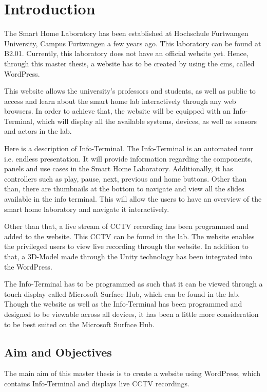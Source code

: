\chapter{Introduction}

The Smart Home Laboratory has been established at Hochschule Furtwangen University, Campus Furtwangen a few years ago. This laboratory can be found at B2.01. Currently, this laboratory does not have an official website yet. Hence, through this master thesis, a website has to be created by using the \ac{cms}, called WordPress.

This website allows the university's professors and students, as well as public to access and learn about the smart home lab interactively through any web browsers. In order to achieve that, the website will be equipped with an Info-Terminal, which will display all the available systems, devices, as well as sensors and actors in the lab.

Here is a description of Info-Terminal. The Info-Terminal is an automated tour i.e. endless presentation. It will provide information regarding the components, panels and use cases in the Smart Home Laboratory. Additionally, it has controllers such as play, pause, next, previous and home buttons. Other than than, there are thumbnails at the bottom to navigate and view all the slides available in the info terminal. This will allow the users to have an overview of the smart home laboratory and navigate it interactively.

Other than that, a live stream of CCTV recording has been programmed and added to the website. This CCTV can be found in the lab. The website enables the privileged users to view live recording through the website. In addition to that, a 3D-Model made through the Unity technology has been integrated into the WordPress.

The Info-Terminal has to be programmed as such that it can be viewed through a touch display called Microsoft Surface Hub, which can be found in the lab. Though the website as well as the Info-Terminal has been programmed and designed to be viewable across all devices, it has been a little more consideration to be best suited on the Microsoft Surface Hub.

\section{Aim and Objectives}
The main aim of this master thesis is to create a website using WordPress, which contains Info-Terminal and displays live CCTV recordings.

